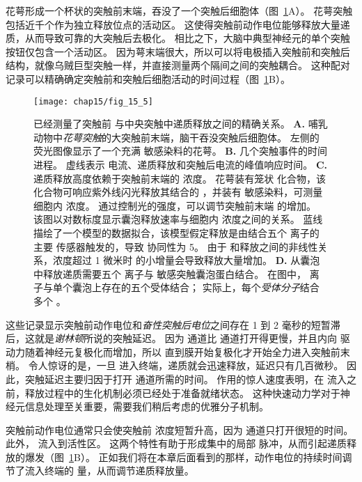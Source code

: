 花萼形成一个杯状的突触前末端，吞没了一个突触后细胞体（图~\ref{fig:15_5}A）。
花萼突触包括近千个作为独立释放位点的活动区。
这使得突触前动作电位能够释放大量递质，从而导致可靠的大突触后去极化。
相比之下，大脑中典型神经元的单个突触按钮仅包含一个活动区。
因为萼末端很大，所以可以将电极插入突触前和突触后结构，就像乌贼巨型突触一样，并直接测量两个隔间之间的突触耦合。
这种配对记录可以精确确定突触前和突触后细胞活动的时间过程（图~\ref{fig:15_5}B）。


\begin{figure}[htbp]
	\centering
	\texttt{[image: chap15/fig\_15\_5]}
	\caption{已经测量了突触前  与中央突触中递质释放之间的精确关系\cite{meinrenken2003hodgkin,sun2007dual}。
	\textbf{A.} 哺乳动物中\textit{花萼突触}的大突触前末端，脑干吞没突触后细胞体。
	左侧的荧光图像显示了一个充满  敏感染料的花萼。
	\textbf{B.} 几个突触事件的时间进程。
	虚线表示  电流、递质释放和突触后电流的峰值响应时间。
	\textbf{C.} 递质释放高度依赖于突触前末端的  浓度。
	花萼装有笼状  化合物，该化合物可响应紫外线闪光释放其结合的 ，并装有  敏感染料，可测量细胞内  浓度。
	通过控制光的强度，可以调节突触前末端  的增加。
	该图以对数标度显示囊泡释放速率与细胞内  浓度之间的关系。
	蓝线描绘了一个模型的数据拟合，该模型假定释放是由结合五个  离子的主要  传感器触发的，导致  协同性为 5。
	由于  和释放之间的非线性关系，浓度超过 1 微米时  的小增量会导致释放大量增加。
	\textbf{D.} 从囊泡中释放递质需要五个  离子与  敏感突触囊泡蛋白结合。
	在图中， 离子与单个囊泡上存在的五个受体结合；
	实际上，每个\textit{受体分子}结合多个 。}
	\label{fig:15_5}
\end{figure}


这些记录显示突触前动作电位和\textit{奋性突触后电位}之间存在 1 到 2 毫秒的短暂滞后，这就是\textit{谢林顿}所说的突触延迟。
因为  通道比  通道打开得更慢，并且内向  驱动力随着神经元复极化而增加，所以  直到膜开始复极化才开始全力进入突触前末梢。
令人惊讶的是，一旦  进入终端，递质就会迅速释放，延迟只有几百微秒。
因此，突触延迟主要归因于打开  通道所需的时间。
 作用的惊人速度表明，在  流入之前，释放过程中的生化机制必须已经处于准备就绪状态。 
这种快速动力学对于神经元信息处理至关重要，需要我们稍后考虑的优雅分子机制。


突触前动作电位通常只会使突触前  浓度短暂升高，因为  通道只打开很短的时间。 
此外， 流入到活性区。
这两个特性有助于形成集中的局部  脉冲，从而引起递质释放的爆发（图~\ref{fig:15_5}B）。
正如我们将在本章后面看到的那样，动作电位的持续时间调节了流入终端的  量，从而调节递质释放量。


